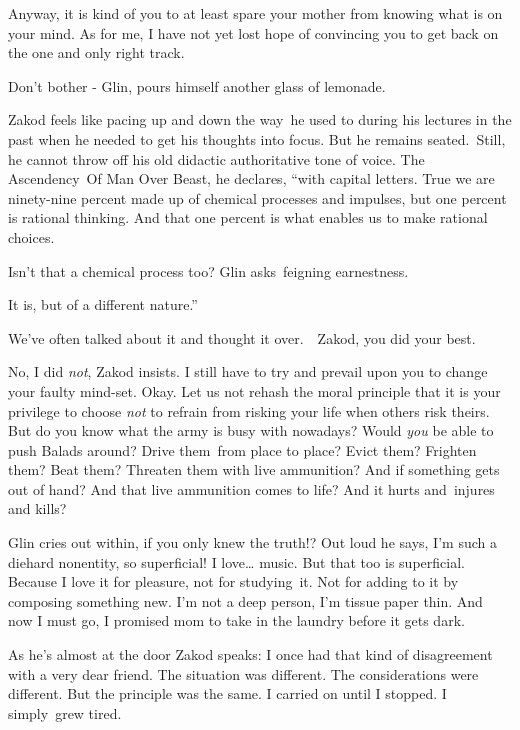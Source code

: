 \documentclass[twoside,11pt]{book}
\begin{document}
{\textquotedbl}Anyway, it is kind of you to at least spare your mother from knowing what is on your mind. As for me, I
have not yet lost hope of convincing you to get back on the one and only right track.{\textquotedbl} 

{\textquotedbl}Don't bother -{\textquotedbl} Glin, pours himself another glass of lemonade. 

Zakod feels like pacing up and down the way~he used to during his lectures in the past when he needed to get his
thoughts into focus. But he remains seated.\ Still, he cannot throw off his old didactic authoritative tone of voice.
{\textquotedbl}The Ascendency\ Of Man Over Beast,{\textquotedbl} he declares, ``with capital letters. True we are
ninety-nine percent made up of chemical processes and impulses, but one percent is rational thinking. And that one
percent is what enables us to make rational choices.{\textquotedbl} 

{\textquotedbl}Isn't that a chemical process too?{\textquotedbl} Glin
asks{\ }feigning earnestness. 

{\textquotedbl}It is, but of a different nature.'' 

{\textquotedbl}We've often talked about it and thought it over.\ \ Zakod, you did your best.{\textquotedbl} 

{\textquotedbl}No, I did \textit{not},{\textquotedbl} Zakod insists. {\textquotedbl}I still have to try and prevail upon
you to change your faulty mind-set. Okay. Let us not rehash the moral principle that it is your privilege to choose
\textit{not} to refrain from risking your life when others risk theirs. But do you know what the army is busy with
nowadays? Would \textit{you} be able to push Balads around? Drive them~from place to place? Evict them? Frighten them?
Beat them? Threaten them with live ammunition? And if something gets out of hand? And that live ammunition comes to
life? And it hurts and~injures and kills?{\textquotedbl} 

Glin cries out within, if you only knew the truth!? Out loud he says, {\textquotedbl}I'm such a diehard nonentity, so
superficial! I love{\dots} music. But that too is superficial. Because I love it for pleasure, not for studying~it. Not
for adding to it by composing something new. I'm not a deep person, I'm tissue paper thin. And now I must go, I
promised mom to take in the laundry before it gets dark.{\textquotedbl} 

As he's almost at the door Zakod speaks: {\textquotedbl}I once had that kind of disagreement with a very dear friend.
The situation was different. The considerations were different. But the principle was the same. I carried on until I
stopped. I simply{\ }grew tired.{\textquotedbl} 
\end{document}
